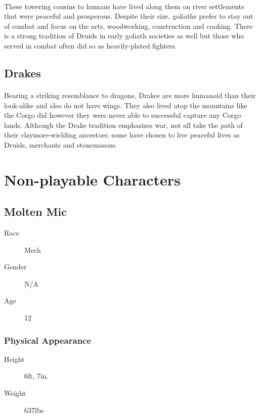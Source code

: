 \paragraph{} These towering cousins to humans have lived along them on river settlements that were peaceful and prosperous. Despite their size, goliaths prefer to stay out of combat and focus on the arts, woodworking, construction and cooking. There is a strong tradition of Druids in early goliath societies as well but those who served in combat often did so as heavily-plated fighters.

\subsection{Drakes}

\paragraph{} Bearing a striking resemblance to dragons, Drakes are more humanoid than their look-alike and also do not have wings. They also lived atop the mountains like the Corgo did however they were never able to successful capture any Corgo lands. Although the Drake tradition emphasizes war, not all take the path of their claymore-wielding ancestors; some have chosen to live peaceful lives as Druids, merchants and stonemasons.

\section{Non-playable Characters}

\subsection{Molten Mic}

\begin{description}
    \item[Race] Mech
    \item[Gender] N/A
    \item[Age] 12  
\end{description}

\subsubsection{Physical Appearance}

\begin{description}
    \item[Height] 6ft, 7in.
    \item[Weight] 637lbs
\end{description}

